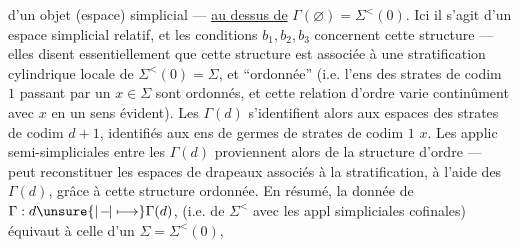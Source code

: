 d'un objet (espace) simplicial --- \uline{au dessus de}
$\Gamma(\varnothing)=\Sigma^{<}(0)$. Ici il s'agit d'un espace
simplicial relatif, et les conditions $b_1,b_2,b_3$
concernent cette structure --- elles disent
essentiellement que cette structure est associée
à une stratification cylindrique locale de
$\Sigma^{<}(0)=\Sigma$, et ``ordonnée'' (i.e. l'ens des
strates de codim $1$ passant par un $x\in\Sigma$ sont
 ordonnés, et cette relation d'ordre varie
continûment avec $x$ en un sens évident).
Les  $\Gamma(d)$ s'identifient alors
aux  espaces des  strates de codim
$d+1$,   identifiés  aux ens de germes de strates
de codim $1$   $x$. Les applic
semi-simpliciales entre les $\Gamma(d)$ proviennent
alors de la structure d'ordre --- 
peut reconstituer les espaces de drapeaux
associés à la stratification, à l'aide des
 $\Gamma(d)$, grâce à cette structure ordonnée.
En résumé, la donnée de $\Gamma:d\unsure{\mid\! -\!|\longmapsto}\Gamma(d)$,
 (i.e. de $\Sigma^{<}$ avec les appl  simpliciales
cofinales) équivaut à celle d'un $\Sigma=\Sigma^{<}(0)$,
